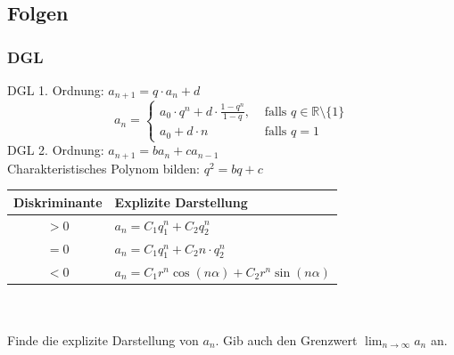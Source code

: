 \documentclass[11pt, a4paper]{article}
\begin{document}
\subsection{Folgen}
\subsubsection{DGL}
DGL 1. Ordnung: $a_{n+1} = q \cdot a_n + d$
\[a_n = \begin{cases}
	a_0 \cdot q^n + d \cdot \frac{1-q^n}{1-q}, &\text{ falls } q \in \mathbb{R} \setminus \{1\} \\
	a_0 + d \cdot n &\text{ falls } q=1
\end{cases}\]
DGL 2. Ordnung: $a_{n+1} = b a_n + c a_{n-1}$ \\
Charakteristisches Polynom bilden: $q^2 = bq+c$ \\
\begin{tabular}{|c|l|}
	\hline
	Diskriminante & Explizite Darstellung \\ \hline
	$>0$ & $a_n = C_1 q_1^n + C_2 q_2^n$ \\
	$=0$ & $a_n = C_1 q_1^n + C_2 n \cdot q_2^n$ \\
	$<0$ & $a_n = C_1 r^n \cos(n\alpha) + C_2 r^n \sin(n\alpha)$ \\ \hline
\end{tabular} \\ \\
Finde die explizite Darstellung von $a_n$. Gib auch den Grenzwert $\lim_{n \rightarrow \infty} a_n$ an.
\end{document}
